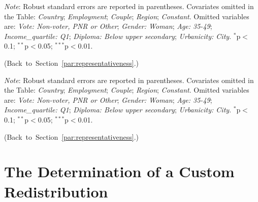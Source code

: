 \begin{table}[h]
    \caption[Correlates of support for global redistribution]{Correlates of support for global redistribution (multivariate OLS regressions). %
    } \label{tab:determinant}
    \makebox[\textwidth][c]{
\resizebox*{!}{.73\textheight}{ %
        
        }
    }
    {\footnotesize \textit{Note}: Robust standard errors are reported in parentheses. Covariates omitted in the Table: \textit{Country}; \textit{Employment}; \textit{Couple}; \textit{Region}; \textit{Constant}. Omitted variables are: \textit{Vote: Non-voter, PNR or Other}; \textit{Gender: Woman}; \textit{Age: 35-49}; \textit{Income\_quartile: Q1}; \textit{Diploma: Below upper secondary}; \textit{Urbanicity: City}. \hfill $^{*}$p$<$0.1; $^{**}$p$<$0.05; $^{***}$p$<$0.01. 
    
    \hfill (Back~to~Section~\ref{par:representativeness}.)
    }
\end{table}

\begin{table}[h]
    \caption[Correlates of answers on custom redistribution]{Correlates of answers on custom redistribution (multivariate OLS regressions). %
    } \label{tab:determinants_custom_redistr}
    \makebox[\textwidth][c]{
\resizebox*{!}{.73\textheight}{ %
        
        }
    }
    {\footnotesize \textit{Note}: Robust standard errors are reported in parentheses. Covariates omitted in the Table: \textit{Country}; \textit{Employment}; \textit{Couple}; \textit{Region}; \textit{Constant}. Omitted variables are: \textit{Vote: Non-voter, PNR or Other}; \textit{Gender: Woman}; \textit{Age: 35-49}; \textit{Income\_quartile: Q1}; \textit{Diploma: Below upper secondary}; \textit{Urbanicity: City}. \hfill $^{*}$p$<$0.1; $^{**}$p$<$0.05; $^{***}$p$<$0.01. 
    
    \hfill (Back~to~Section~\ref{par:representativeness}.)
    }
\end{table}

\clearpage
\section{The Determination of a Custom Redistribution}\label{app:algo}

